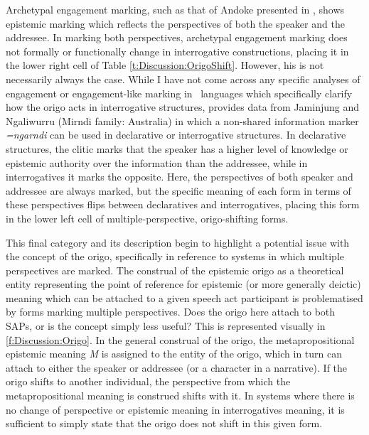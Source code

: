 Archetypal engagement marking, such as that of Andoke presented in , shows epistemic marking which reflects the perspectives of both the speaker and the addressee. In marking both perspectives, archetypal engagement marking does not formally or functionally change in interrogative constructions, placing it in the lower right cell of Table \ref{t:Discussion:OrigoShift}. However, his is not necessarily always the case. While I have not come across any specific analyses of engagement or engagement-like marking in \lfam\ languages which specifically clarify how the origo acts in interrogative structures,  provides data from Jaminjung and Ngaliwurru (Mirndi family: Australia) in which a non-shared information marker \textit{=ngarndi} can be used in declarative or interrogative structures. In declarative structures, the clitic marks that the speaker has a higher level of knowledge or epistemic authority over the information than the addressee, while in interrogatives it marks the opposite. Here, the perspectives of both speaker and addressee are always marked, but the specific meaning of each form in terms of these perspectives flips between declaratives and interrogatives, placing this form in the lower left cell of multiple-perspective, origo-shifting forms.

This final category and its description begin to highlight a potential issue with the concept of the origo, specifically in reference to systems in which multiple perspectives are marked. The construal of the epistemic origo as a theoretical entity representing the point of reference for epistemic (or more generally deictic) meaning which can be attached to a given speech act participant is problematised by forms marking multiple perspectives. Does the origo here attach to both SAPs, or is the concept simply less useful? This is represented visually in \ref{f:Discussion:Origo}. In the general construal of the origo, the metapropositional epistemic meaning \textit{M} is assigned to the entity of the origo, which in turn can attach to either the speaker or addressee (or a character in a narrative). If the origo shifts to another individual, the perspective from which the metapropositional meaning is construed shifts with it. In systems where there is no change of perspective or epistemic meaning in interrogatives meaning, it is sufficient to simply state that the origo does not shift in this given form.


